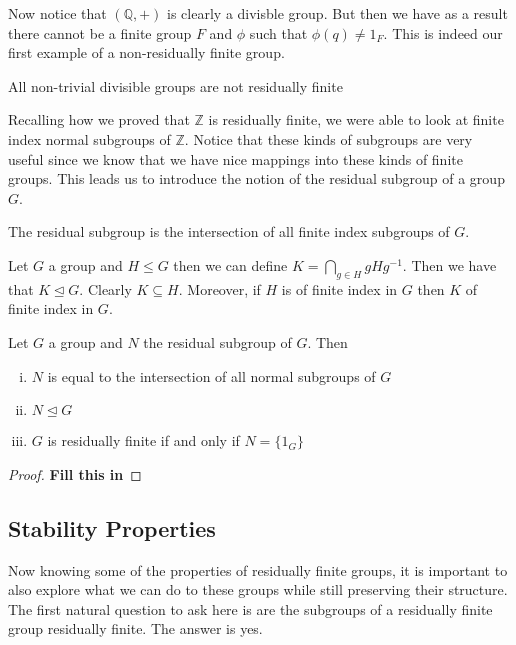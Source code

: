 Now notice that $(\mathbb{Q}, +)$ is clearly a divisble group. But then we have
as a result there cannot be a finite group $F$ and  $\phi$ such that $\phi(q)
\neq 1_F$. This is indeed our first example of a non-residually finite group.

\begin{propn}
  All non-trivial divisible groups are not residually finite
\end{propn}
Recalling how we proved that $\mathbb{Z}$ is residually finite, we were able to 
look at finite index normal subgroups of $\mathbb{Z}$. Notice that these kinds 
of subgroups  are very useful since we know that we have nice mappings into these 
kinds of finite groups. This leads us to introduce the notion of the residual 
subgroup of a group $G$.

\begin{defn}
  The residual subgroup is the intersection of all finite index subgroups of
  $G$.
\end{defn}
\begin{lemma}
  Let $G$ a group and $H \le G$ then we can define $K = \bigcap_{g \in H}
  gHg^{-1}$. Then we have that $K \trianglelefteq G$. Clearly $K \subseteq H$.
  Moreover, if $H$ is of finite index in $G$ then $K$ of finite index in $G$.
\end{lemma}

\begin{thm}
  Let $G$ a group and $N$ the residual subgroup of $G$. Then
  \begin{enumerate}[(i)]
    \item $N$ is equal to the intersection of all normal subgroups of $G$
    \item $N \trianglelefteq G$
    \item $G$ is residually finite if and only if $N = \{1_G\} $
  \end{enumerate}
\end{thm}
\begin{proof}
\textbf{Fill this in}
\end{proof}

\subsection{Stability Properties}

Now knowing some of the properties of residually finite groups, it is important to 
also explore what we can do to these groups while still preserving their structure. 
The first natural question to ask here is are the subgroups of a residually
finite group residually finite. The answer is yes.

